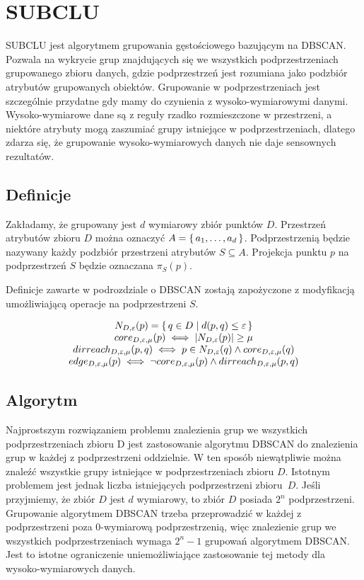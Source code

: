 \section{SUBCLU}
SUBCLU jest algorytmem grupowania gęstościowego bazującym na DBSCAN. Pozwala na wykrycie grup znajdujących się we wszystkich podprzestrzeniach grupowanego zbioru danych, gdzie podprzestrzeń jest rozumiana jako podzbiór atrybutów grupowanych obiektów. Grupowanie w podprzestrzeniach jest szczególnie przydatne gdy mamy do czynienia z wysoko-wymiarowymi danymi. Wysoko-wymiarowe dane są z reguły rzadko rozmieszczone w przestrzeni, a niektóre atrybuty mogą zaszumiać grupy istniejące w podprzestrzeniach, dlatego zdarza się, że grupowanie wysoko-wymiarowych danych nie daje sensownych rezultatów. 

\subsection{Definicje}

Zakładamy, że grupowany jest $ d $ wymiarowy zbiór punktów $ D $. Przestrzeń atrybutów zbioru $ D $ można oznaczyć $ A=\set{a_1,\dots,a_d} $. Podprzestrzenią będzie nazywany każdy podzbiór przestrzeni atrybutów $ S \subseteq A $. Projekcja punktu $ p $ na podprzestrzeń $ S $ będzie oznaczana $\pi_S(p) $. 

Definicje zawarte w podrozdziale o DBSCAN zostają zapożyczone z modyfikacją umożliwiającą operacje na podprzestrzeni $ S $.

\begin{equation}
\begin{array}{c}
	N_{D,\varepsilon}(p) = \set{q \in D | d(p, q) \le \varepsilon}\\
	core_{D,\varepsilon,\mu}(p) \iff |N_{D,\varepsilon}(p)| \ge \mu\\
	dirreach_{D,\varepsilon,\mu}(p, q) \iff p \in N_{D,\varepsilon}(q) \land core_{D,\varepsilon,\mu}(q)\\
		edge_{D,\varepsilon,\mu}(p) \iff \neg core_{D,\varepsilon,\mu}(p) \land dirreach_{D,\varepsilon,\mu}(p,q)\\
\end{array}
\end{equation}

\subsection{Algorytm}
Najprostszym rozwiązaniem problemu znalezienia grup we wszystkich podprzestrzeniach zbioru D jest zastosowanie algorytmu DBSCAN do znalezienia grup w każdej z podprzestrzeni oddzielnie. W ten sposób niewątpliwie można znaleźć wszystkie grupy istniejące w podprzestrzeniach zbioru $ D $. Istotnym problemem jest jednak liczba istniejących podprzestrzeni \mbox{zbioru $ D $}. Jeśli przyjmiemy, że zbiór $ D $ jest $ d $ wymiarowy, to zbiór $ D $ posiada $ 2^n $ podprzestrzeni. Grupowanie algorytmem DBSCAN trzeba przeprowadzić w każdej z podprzestrzeni poza $ 0 $-wymiarową podprzestrzenią, więc znalezienie grup we wszystkich podprzestrzeniach wymaga $ 2^n-1 $ grupowań algorytmem DBSCAN. Jest to istotne ograniczenie uniemożliwiające zastosowanie tej metody dla wysoko-wymiarowych danych.